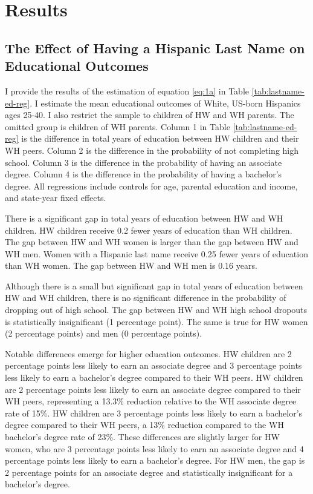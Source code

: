 \section{Results}\label{sec:results}

\subsection{The Effect of Having a Hispanic Last Name on Educational Outcomes}

I provide the results of the estimation of equation \ref{eq:1a} in Table \ref{tab:lastname-ed-reg}. I estimate the mean educational outcomes of White, US-born Hispanics ages 25-40. I also restrict the sample to children of HW and WH parents. The omitted group is children of WH parents. Column 1 in Table \ref{tab:lastname-ed-reg} is the difference in total years of education between HW children and their WH peers. Column 2 is the difference in the probability of not completing high school. Column 3 is the difference in the probability of having an associate degree. Column 4 is the difference in the probability of having a bachelor’s degree. All regressions include controls for age, parental education and income, and state-year fixed effects.

There is a significant gap in total years of education between HW and WH children. HW children receive 0.2 fewer years of education than WH children. The gap between HW and WH women is larger than the gap between HW and WH men. Women with a Hispanic last name receive 0.25 fewer years of education than WH women. The gap between HW and WH men is 0.16 years.

Although there is a small but significant gap in total years of education between HW and WH children, there is no significant difference in the probability of dropping out of high school. The gap between HW and WH high school dropouts is statistically insignificant (1 percentage point). The same is true for HW women (2 percentage points) and men (0 percentage points).

Notable differences emerge for higher education outcomes. HW children are 2 percentage points less likely to earn an associate degree and 3 percentage points less likely to earn a bachelor’s degree compared to their WH peers. HW children are 2 percentage points less likely to earn an associate degree compared to their WH peers, representing a 13.3\% reduction relative to the WH associate degree rate of 15\%. HW children are 3 percentage points less likely to earn a bachelor’s degree compared to their WH peers, a 13\% reduction compared to the WH bachelor’s degree rate of 23\%. These differences are slightly larger for HW women, who are 3 percentage points less likely to earn an associate degree and 4 percentage points less likely to earn a bachelor’s degree. For HW men, the gap is 2 percentage points for an associate degree and statistically insignificant for a bachelor’s degree.

